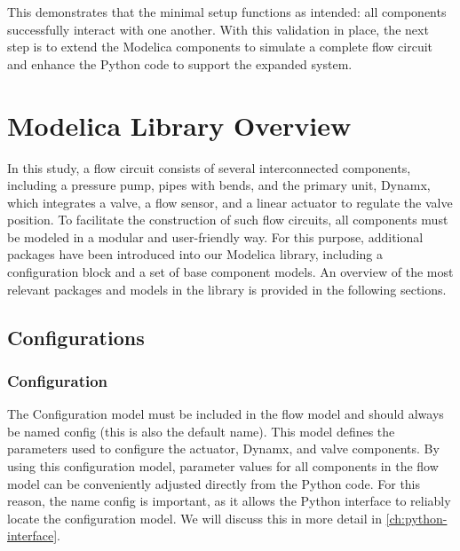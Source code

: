 \documentclass[we,final,11pt,oneside,openany]{uantwerpenbamathesis}
\begin{document}
This demonstrates that the minimal setup functions as intended: all components successfully interact with one another.
With this validation in place, the next step is to extend the Modelica components to simulate a complete flow circuit and enhance the Python code to support the expanded system.

\chapter{Modelica Library Overview}
\label{ch:modelica-library-overview}

In this study, a flow circuit consists of several interconnected components, including a pressure pump, pipes with bends, and the primary unit, Dynamx, which integrates a valve, a flow sensor, and a linear actuator to regulate the valve position.
To facilitate the construction of such flow circuits, all components must be modeled in a modular and user-friendly way.
For this purpose, additional packages have been introduced into our Modelica library, including a configuration block and a set of base component models.
An overview of the most relevant packages and models in the library is provided in the following sections.


\section{Configurations}
\label{sec:configurations}

\subsection{Configuration}
\label{subsec:configuration}

The Configuration model must be included in the flow model and should always be named config (this is also the default name).
This model defines the parameters used to configure the actuator, Dynamx, and valve components.
By using this configuration model, parameter values for all components in the flow model can be conveniently adjusted directly from the Python code.
For this reason, the name config is important, as it allows the Python interface to reliably locate the configuration model.
We will discuss this in more detail in \autoref{ch:python-interface}.
\end{document}
